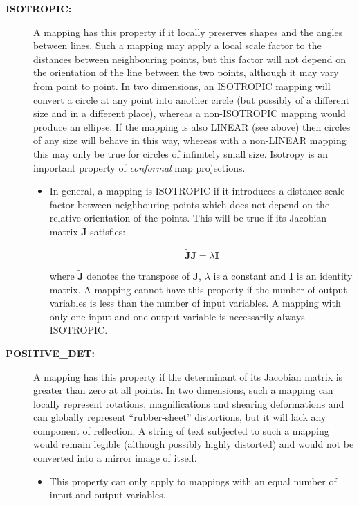 \documentclass[twoside,11pt]{article}
\newcommand{\name}[1]{\mbox{\small{#1}}}
\begin{document}
\begin{description}
\item[\textbf{ISOTROPIC:}] A mapping has this property if it locally preserves
shapes and the angles between lines. 
Such a mapping may apply a local scale factor to the distances between
neighbouring points, but this factor will not depend on the orientation
of the line between the two points, although it may vary from point to
point. 
In two dimensions, an \name{ISOTROPIC} mapping will convert a circle at any
point into another circle (but possibly of a different size and in a
different place), whereas a non-\name{ISOTROPIC} mapping would produce an
ellipse. 
If the mapping is also \name{LINEAR} (see above) then circles of
any size will behave in this way, whereas with a non-\name{LINEAR}
mapping this may only be true for circles of infinitely small size. 
Isotropy is an important property of \emph{conformal} map projections. 

\begin{itemize}
\item In general, a mapping is \name{ISOTROPIC} if it introduces a distance
scale factor between neighbouring points which does not depend on the
relative orientation of the points. 
This will be true if its Jacobian matrix $\textbf{J}$ satisfies: 

\begin{equation}
\mathbf{\tilde{J}} \mathbf{J} = \lambda \mathbf{I}
\end{equation}

where $\mathbf{\tilde{J}}$ denotes the transpose of $\mathbf{J}$, $\lambda$ is a
constant and $\mathbf{I}$ is an identity matrix. 
A mapping cannot have this property if the number of output variables is
less than the number of input variables. 
A mapping with only one input and one output variable is necessarily always
\name{ISOTROPIC}. 

\end{itemize}

\item[\textbf{POSITIVE\_DET:}] A mapping has this property if the determinant
of its Jacobian matrix is greater than zero at all points. 
In two dimensions, such a mapping can locally represent rotations,
magnifications and shearing deformations and can globally represent
``rubber-sheet'' distortions, but it will lack any component of reflection. 
A string of text subjected to such a mapping would remain legible (although
possibly highly distorted) and would not be converted into a mirror image of
itself. 

\begin{itemize}
\item This property can only apply to mappings with an equal number of input
and output variables. 
\end{itemize}


\end{description}
\end{document}
